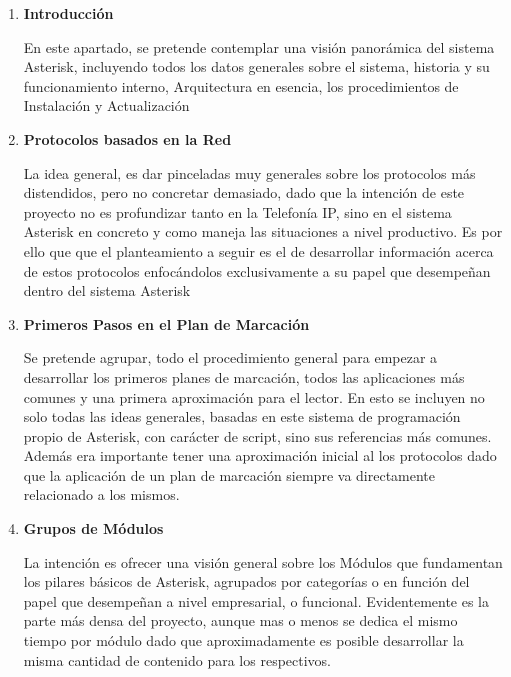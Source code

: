 \begin{enumerate}

\setlength{\itemsep}{10pt}

	\item \textbf{Introducción} 
	
	En este apartado, se pretende contemplar una visión panorámica del sistema Asterisk, incluyendo todos los datos generales sobre el sistema, historia y su funcionamiento interno, Arquitectura en esencia, los procedimientos de Instalación y Actualización 
		
	\item \textbf{Protocolos basados en la Red} 
	
	La idea general, es dar pinceladas muy generales sobre los protocolos más distendidos, pero no concretar demasiado, dado que la intención de este proyecto no es profundizar tanto en la Telefonía IP, sino en el sistema Asterisk en concreto y como maneja las situaciones a nivel productivo. Es por ello que que el planteamiento a seguir es el de desarrollar información acerca de estos protocolos enfocándolos exclusivamente a su papel que desempeñan dentro del sistema Asterisk
	
	\item \textbf{Primeros Pasos en el Plan de Marcación} 
	
	Se pretende agrupar, todo el procedimiento general para empezar a desarrollar los primeros planes de marcación, todos las aplicaciones más comunes y una primera aproximación para el lector. En esto se incluyen no solo todas las ideas generales, basadas en este sistema de programación propio de Asterisk, con carácter de script, sino sus referencias más comunes. Además era importante tener una aproximación inicial al los protocolos dado que la aplicación de un plan de marcación siempre va directamente relacionado a los mismos.
	
	\item \textbf{Grupos de Módulos} 
		
	La intención es ofrecer una visión general sobre los Módulos que fundamentan los pilares básicos de Asterisk, agrupados por categorías o en función del papel que desempeñan a nivel empresarial, o funcional. Evidentemente es la parte más densa del proyecto, aunque mas o menos se dedica el mismo tiempo por módulo dado que aproximadamente es posible desarrollar la misma cantidad de contenido para los respectivos.\\
	
	\begin{itemize}
	 

\end{itemize}
\end{enumerate}
